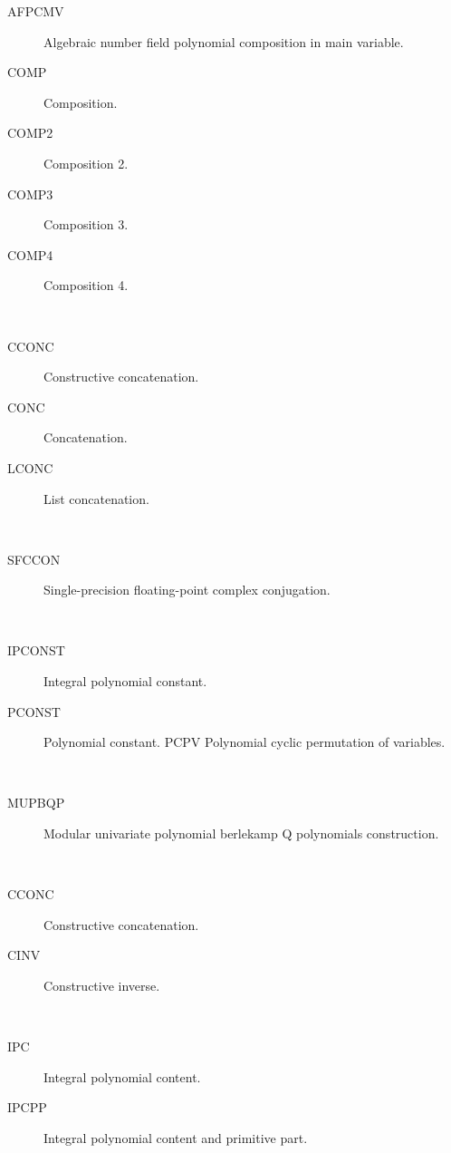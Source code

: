 \begin{description}
  \begin{description}
  \item[AFPCMV]  Algebraic number field polynomial composition in main
    variable.
  \item[COMP]  Composition.
  \item[COMP2]  Composition 2.
  \item[COMP3]  Composition 3.
  \item[COMP4]  Composition 4.
  \end{description}
\item[concatenation] \ \ 
  \begin{description}
  \item[CCONC]  Constructive concatenation.
  \item[CONC]  Concatenation.
  \item[LCONC]  List concatenation.
  \end{description}
\item[conjugation] \ \ 
  \begin{description}
  \item[SFCCON]  Single-precision floating-point complex conjugation.
  \end{description}
\item[constant] \ \ 
  \begin{description}
  \item[IPCONST]  Integral polynomial constant.
  \item[PCONST]  Polynomial constant. PCPV Polynomial cyclic permutation of
    variables.
  \end{description}
\item[construction] \ \ 
  \begin{description}
  \item[MUPBQP]  Modular univariate polynomial berlekamp Q polynomials
    construction.
  \end{description}
\item[constructive] \ \ 
  \begin{description}
  \item[CCONC]  Constructive concatenation.
  \item[CINV]  Constructive inverse.
  \end{description}
\item[content] \ \ 
  \begin{description}
  \item[IPC]  Integral polynomial content.
  \item[IPCPP]  Integral polynomial content and primitive part.

\end{description}
\end{description}
